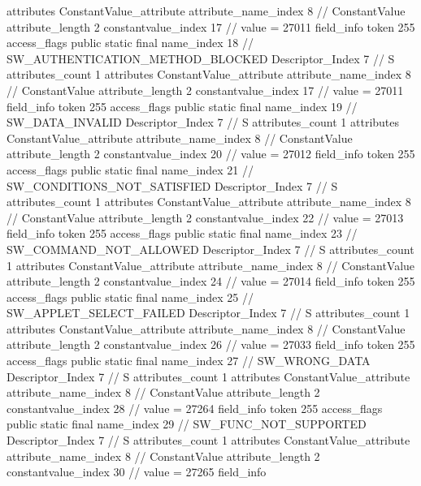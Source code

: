 {{{{{				attributes {
				ConstantValue_attribute {
					attribute_name_index	8		// ConstantValue
					attribute_length	2
					constantvalue_index	17		// value = 27011
				}
				}
			}
			field_info {
				token	255
				access_flags	public static final
				name_index	18		// SW_AUTHENTICATION_METHOD_BLOCKED
				Descriptor_Index	7		// S
				attributes_count	1
				attributes {
				ConstantValue_attribute {
					attribute_name_index	8		// ConstantValue
					attribute_length	2
					constantvalue_index	17		// value = 27011
				}
				}
			}
			field_info {
				token	255
				access_flags	public static final
				name_index	19		// SW_DATA_INVALID
				Descriptor_Index	7		// S
				attributes_count	1
				attributes {
				ConstantValue_attribute {
					attribute_name_index	8		// ConstantValue
					attribute_length	2
					constantvalue_index	20		// value = 27012
				}
				}
			}
			field_info {
				token	255
				access_flags	public static final
				name_index	21		// SW_CONDITIONS_NOT_SATISFIED
				Descriptor_Index	7		// S
				attributes_count	1
				attributes {
				ConstantValue_attribute {
					attribute_name_index	8		// ConstantValue
					attribute_length	2
					constantvalue_index	22		// value = 27013
				}
				}
			}
			field_info {
				token	255
				access_flags	public static final
				name_index	23		// SW_COMMAND_NOT_ALLOWED
				Descriptor_Index	7		// S
				attributes_count	1
				attributes {
				ConstantValue_attribute {
					attribute_name_index	8		// ConstantValue
					attribute_length	2
					constantvalue_index	24		// value = 27014
				}
				}
			}
			field_info {
				token	255
				access_flags	public static final
				name_index	25		// SW_APPLET_SELECT_FAILED
				Descriptor_Index	7		// S
				attributes_count	1
				attributes {
				ConstantValue_attribute {
					attribute_name_index	8		// ConstantValue
					attribute_length	2
					constantvalue_index	26		// value = 27033
				}
				}
			}
			field_info {
				token	255
				access_flags	public static final
				name_index	27		// SW_WRONG_DATA
				Descriptor_Index	7		// S
				attributes_count	1
				attributes {
				ConstantValue_attribute {
					attribute_name_index	8		// ConstantValue
					attribute_length	2
					constantvalue_index	28		// value = 27264
				}
				}
			}
			field_info {
				token	255
				access_flags	public static final
				name_index	29		// SW_FUNC_NOT_SUPPORTED
				Descriptor_Index	7		// S
				attributes_count	1
				attributes {
				ConstantValue_attribute {
					attribute_name_index	8		// ConstantValue
					attribute_length	2
					constantvalue_index	30		// value = 27265
				}
				}
			}
			field_info {
}}}}}
